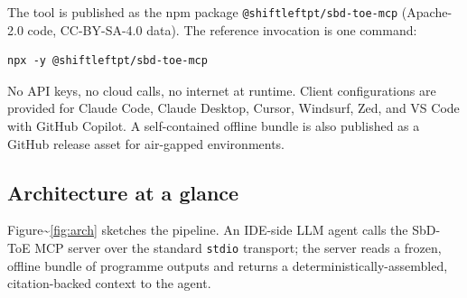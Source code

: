 \documentclass[conference]{IEEEtran}
\begin{document}
The tool is published as the npm package
\texttt{@shiftleftpt/sbd-toe-mcp} (Apache-2.0 code, CC-BY-SA-4.0 data).
The reference invocation is one command:

\begin{verbatim}
npx -y @shiftleftpt/sbd-toe-mcp
\end{verbatim}

\noindent No API keys, no cloud calls, no internet at runtime. Client
configurations are provided for Claude Code, Claude Desktop, Cursor,
Windsurf, Zed, and VS Code with GitHub Copilot. A self-contained offline
bundle is also published as a GitHub release asset for air-gapped
environments.

\subsection{Architecture at a glance}\label{architecture-at-a-glance}

Figure\textasciitilde{}\ref{fig:arch} sketches the pipeline. An IDE-side
LLM agent calls the SbD-ToE MCP server over the standard \texttt{stdio}
transport; the server reads a frozen, offline bundle of programme
outputs and returns a deterministically-assembled, citation-backed
context to the agent.
\end{document}
